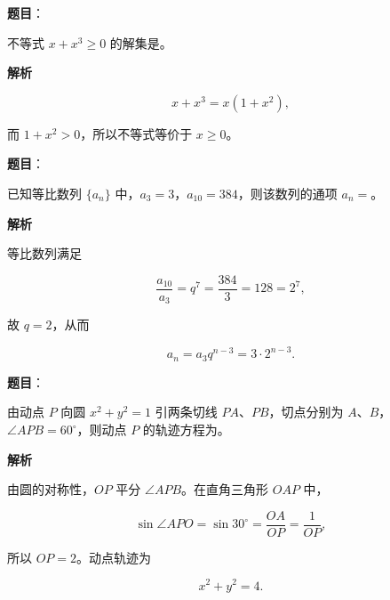 \begin{answer}

\textbf{题目}：

不等式 $x+x^3\geqslant0$ 的解集是\gkblank{}。

\textbf{解析}

\nopagebreak[4]
\[
x+x^3=x(1+x^2),
\]

而 $1+x^2>0$，所以不等式等价于 $x\geqslant0$。

\gkanswer{答案：$[0,+\infty)$}

\end{answer}
\begin{answer}

\textbf{题目}：

已知等比数列 $\{a_n\}$ 中，$a_3=3$，$a_{10}=384$，则该数列的通项 $a_n=$\gkblank{}。

\textbf{解析}

等比数列满足

\nopagebreak[4]
\[
\frac{a_{10}}{a_3}=q^7=\frac{384}{3}=128=2^7,
\]

故 $q=2$，从而

\nopagebreak[4]
\[
a_n=a_3q^{n-3}=3\cdot2^{n-3}.
\]


\end{answer}
\begin{answer}

\textbf{题目}：

由动点 $P$ 向圆 $x^2+y^2=1$ 引两条切线 $PA\text{、}PB$，切点分别为 $A\text{、}B$，$\angle APB=60^\circ$，则动点 $P$ 的轨迹方程为\gkblank{}。

\textbf{解析}

由圆的对称性，$OP$ 平分 $\angle APB$。在直角三角形 $OAP$ 中，

\nopagebreak[4]
\[
\sin\angle APO=\sin30^\circ=\frac{OA}{OP}=\frac1{OP},
\]

所以 $OP=2$。动点轨迹为

\nopagebreak[4]
\[
x^2+y^2=4.
\]


\end{answer}
